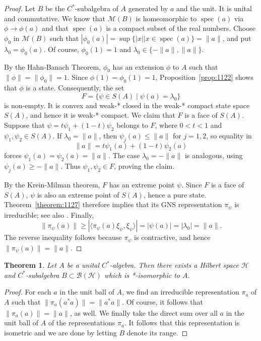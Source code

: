 \documentclass{book}
\newtheorem{theorem}[definition]{Theorem}
\def\cstar{\(C^*\)-algebra}
\begin{document}
\begin{proof}
  Let \(B\) be the \(C^*\)-subalgebra of \(A\) generated by \(a\) and the unit. It is
  unital and commutative. We know that \(\mathcal{M}(B)\) is homeomorphic to \(\operatorname{spec}(a)\)
  via \(\phi \rightarrow \phi(a)\) and that \(\operatorname{spec}(a)\) is a compact subset of the real numbers.
  Choose \(\phi_0\) in \(\mathcal{M}(B)\) such that \(|\phi_0(a)| = \sup\{|x| | x \in \operatorname{spec}(a)\} = \|a\|\), and put
  \(\lambda_0=\phi_0(a)\). Of course, \(\phi_0(1)=1\) and \(\lambda_0\in\{-\|a\|,\|a\|\}\).\par
  By the Hahn-Banach Theorem, \(\phi_0\) has an extension \(\phi\) to \(A\) such that \(\|\phi\|=\|\phi_0\|=1\). Since
  \(\phi(1)=\phi_0(1)=1\), Proposition~\ref{prop:1122} shows that \(\phi\) is a state. Consequently, the set
  \[
    F=\{\psi\in S(A)\mid\psi(a)=\lambda_0\}
  \]
  is non-empty. It is convex and weak-* closed in the weak-* compact state space \(S(A)\), and hence it is weak-* compact. We claim that
  \(F\) is a face of \(S(A)\). Suppose that \(\psi=t\psi_1+(1-t)\psi_2\) belongs to \(F\), where \(0<t<1\) and
  \(\psi_1,\psi_2\in S(A)\). If \(\lambda_0=\|a\|\), then \(\psi_j(a)\leq\|a\|\) for \(j=1,2\), so equality in
  \[
    \|a\|=t\psi_1(a)+(1-t)\psi_2(a)
  \]
  forces \(\psi_1(a)=\psi_2(a)=\|a\|\). The case \(\lambda_0=-\|a\|\) is analogous, using \(\psi_j(a)\geq-\|a\|\).
  Thus \(\psi_1,\psi_2\in F\), proving the claim.\par
  By the Krein-Milman theorem, \(F\) has an extreme point \(\psi\). Since \(F\) is a face of \(S(A)\), \(\psi\) is also an extreme point
  of \(S(A)\), hence a pure state. Theorem~\ref{theorem:1127} therefore implies that its GNS representation \(\pi_\psi\) is irreducible;
  see also \cite[Section 7.2]{NachtergaeleSims2016}. Finally,
  \[
    \|\pi_\psi(a)\|\geq
    |\langle\pi_\psi(a)\xi_\psi,\xi_\psi\rangle|
    =|\psi(a)|=|\lambda_0|=\|a\|.
  \]
  The reverse inequality follows because \(\pi_\psi\) is contractive, and hence \(\|\pi_\psi(a)\|=\|a\|\).
\end{proof}
\begin{theorem}\label{theorem:1128}
  Let \(A\) be a unital \cstar. Then there exists a Hilbert space
  \(\mathcal{H}\) and \(C^*\)-subalgebra \(B \subset \mathcal{B}(\mathcal{H})\) which is *-isomorphic to \(A\).
\end{theorem}
\begin{proof}
  For each \(a\) in
  the unit ball of \(A\), we find an irreducible representation \(\pi_a\) of \(A\) such that
  \(\|\pi_a(a^*a)\| = \|a^*a\| \). Of course, it follows that \(\|\pi_a(a)\| = \|a\| \), as well. We
  finally take the direct sum over all \(a\) in the unit ball of \(A\) of the representations
  \(\pi_a\). It follows that this representation is isometric and we are done by letting
  \(B\) denote its range.
\end{proof} 
\end{document}
